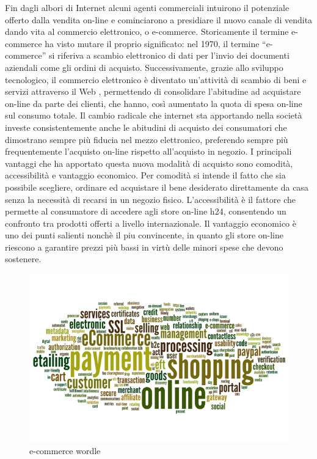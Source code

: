 Fin dagli albori di Internet alcuni agenti commerciali intuirono il potenziale offerto dalla vendita on-line e cominciarono a presidiare il nuovo canale di vendita dando vita al commercio elettronico, o e-commerce.
\newline
Storicamente il termine e-commerce ha visto mutare il proprio significato: nel 1970, il termine “e-commerce” si riferiva a scambio elettronico di dati per l’invio dei documenti aziendali come gli ordini di acquisto. Successivamente, grazie allo sviluppo tecnologico, il commercio elettronico è diventato un’attività di scambio di beni e servizi attraverso il Web \cite{commerce_intro_1}, permettendo di consolidare l’abitudine ad acquistare on-line da parte dei clienti, che hanno, così aumentato la quota di spesa on-line sul consumo totale.
\newline
Il cambio radicale che internet sta apportando nella società investe consistentemente anche le abitudini di acquisto dei consumatori che dimostrano sempre più fiducia nel mezzo elettronico, preferendo sempre più frequentemente l’acquisto on-line rispetto all’acquisto in negozio.
\newline
I principali vantaggi che ha apportato questa nuova modalità di acquisto sono comodità, accessibilità e vantaggio economico.
\newline
Per comodità si intende il fatto che sia possibile scegliere, ordinare ed acquistare il bene desiderato direttamente da casa senza la necessità di recarsi in un negozio fisico.
\newline
L'accessibilità è il fattore che permette al consumatore di accedere agli store on-line h24, consentendo un confronto tra prodotti offerti a livello internazionale.
\newline
Il vantaggio economico è uno dei punti salienti nonchè il piu convincente, in quanto gli store on-line riescono a garantire prezzi più bassi in virtù delle minori spese che devono sostenere.
\begin{figure}[htb]
 \centering
 \includegraphics[width=0.8\linewidth]{images/introduction/ecommerce-wordle.jpg}\hfill
 \caption[e-commerce wordle]{e-commerce wordle}
 \label{fig:e_commerce_wordle}
\end{figure}
